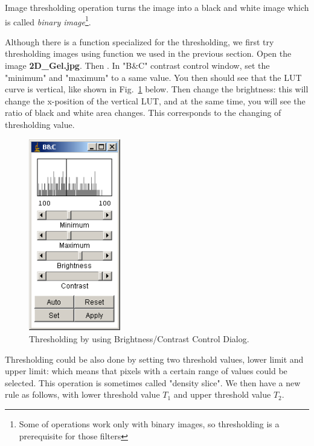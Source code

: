 Image thresholding operation turns the image into a black and white image
which is called \textit{binary image}\footnote{Some of operations work only with binary images, so thresholding is a prerequisite for those filters}.

\begin{indentexercise}{1}
Although there is a function specialized for
the thresholding, we first try thresholding images using
 function
we used in the previous section. Open the image \textbf{2D\_Gel.jpg}.
Then . 
In "B\&C" contrast control window, set the "minimum" and "maximum" to a same value. You then should
see that the LUT curve is vertical, like shown in Fig.~\ref{fig:img106} below. Then
change the brightness: this will change the x-position of the vertical
LUT, and at the same time, you will see the ratio of black and white
area changes. This corresponds to the changing of thresholding value.


\begin{figure}[htbp]
\begin{center}
\includegraphics[width=4cm]{fig/CMCIBasicCourse201102-img106.png}
\caption{ Thresholding by using Brightness/Contrast Control Dialog.}
\label{fig:img106}
\end{center}
\end{figure}
\end{indentexercise}
 
Thresholding could be also done by setting two threshold values, lower
limit and upper limit: which means that pixels with a certain range of
values could be selected. This operation is sometimes called
"density slice". We then have a new rule as follows, with lower threshold value $T_1$ and upper threshold value $T_2$.

